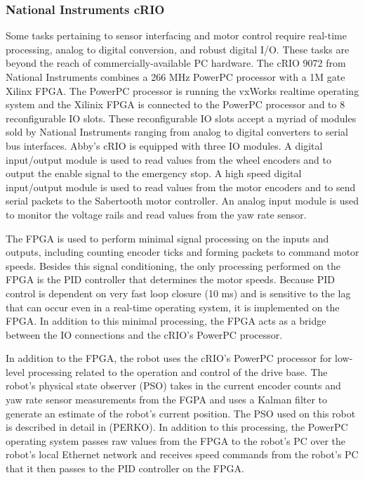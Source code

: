 \documentclass{cwru}
\begin{document}
\subsubsection[National Instruments cRIO]{National Instruments cRIO}
Some tasks pertaining to sensor interfacing and motor control require real-time processing, analog to digital conversion, and robust digital I/O. These tasks are beyond the reach of commercially-available PC hardware. The cRIO 9072 from National Instruments combines a 266 MHz PowerPC processor with a 1M gate Xilinx FPGA. The PowerPC processor is running the vxWorks realtime operating system and the Xilinix FPGA is connected to the PowerPC processor and to 8 reconfigurable IO slots. These reconfigurable IO slots accept a myriad of modules sold by National Instruments ranging from analog to digital converters to serial bus interfaces. Abby{\textquoteright}s cRIO is equipped with three IO modules. A digital input/output module is used to read values from the wheel encoders and to output the enable signal to the emergency stop. A high speed digital input/output module is used to read values from the motor encoders and to send serial packets to the Sabertooth motor controller. An analog input module is used to monitor the voltage rails and read values from the yaw rate sensor.

The FPGA is used to perform minimal signal processing on the inputs and outputs, including counting encoder ticks and forming packets to command motor speeds. Besides this signal conditioning, the only processing performed on the FPGA is the PID controller that determines the motor speeds. Because PID control is dependent on very fast loop closure (10 ms) and is sensitive to the lag that can occur even in a real-time operating system, it is implemented on the FPGA. In addition to this minimal processing, the FPGA acts as a bridge between the IO connections and the cRIO{\textquoteright}s PowerPC processor.

In addition to the FPGA, the robot uses the cRIO{\textquoteright}s PowerPC processor for low-level processing related to the operation and control of the drive base. The robot{\textquoteright}s physical state observer (PSO) takes in the current encoder counts and yaw rate sensor measurements from the FGPA and uses a Kalman filter to generate an estimate of the robot{\textquoteright}s current position. The PSO used on this robot is described in detail in (PERKO). In addition to this processing, the PowerPC operating system passes raw values from the FPGA to the robot{\textquoteright}s PC over the robot{\textquoteright}s local Ethernet network and receives speed commands from the robot{\textquoteright}s PC that it then passes to the PID controller on the FPGA.
\end{document}
